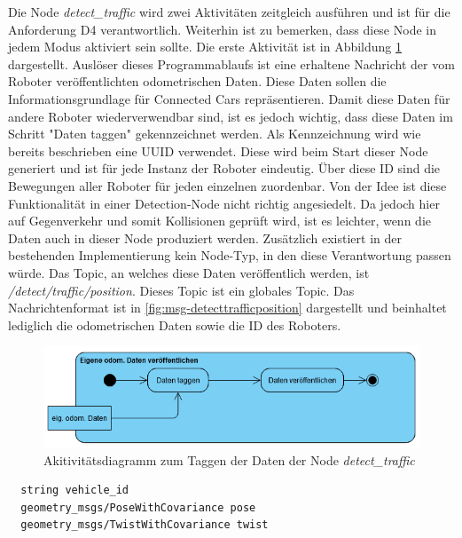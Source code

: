 Die Node \textit{detect\_traffic} wird zwei Aktivitäten zeitgleich ausführen und ist für die Anforderung D4 verantwortlich. Weiterhin ist zu bemerken, dass diese Node in jedem Modus
aktiviert sein sollte. Die erste Aktivität ist in Abbildung \ref{fig:DetectTraffic_Odom_activity} dargestellt.
Auslöser dieses Programmablaufs ist eine erhaltene Nachricht der vom Roboter veröffentlichten odometrischen Daten. Diese Daten sollen die Informationsgrundlage für Connected Cars
repräsentieren. Damit diese Daten für andere Roboter wiederverwendbar sind, ist es jedoch wichtig, dass diese Daten im Schritt "Daten taggen" gekennzeichnet werden. Als Kennzeichnung
wird wie bereits beschrieben eine UUID verwendet. Diese wird beim Start dieser Node generiert und ist für jede Instanz der Roboter eindeutig. Über diese ID sind die Bewegungen aller Roboter
für jeden einzelnen zuordenbar. Von der Idee ist diese Funktionalität in einer Detection-Node nicht richtig angesiedelt. Da jedoch hier auf Gegenverkehr und somit Kollisionen geprüft wird, ist
es leichter, wenn die Daten auch in dieser Node produziert werden. Zusätzlich existiert in der bestehenden Implementierung kein Node-Typ, in den diese Verantwortung passen würde.
Das Topic, an welches diese Daten veröffentlich werden, ist \textit{/detect/traffic/position}. Dieses Topic ist ein globales Topic. Das Nachrichtenformat ist in \ref{fig:msg-detecttrafficposition}
dargestellt und beinhaltet lediglich die odometrischen Daten sowie die ID des Roboters.

\begin{figure}[h!]
  \centering
  \includegraphics[width=\linewidth]{images/DetectTraffic_odom_activity.PNG}
  \caption{Akitivitätsdiagramm zum Taggen der Daten der Node \textit{detect\_traffic}}
  \label{fig:DetectTraffic_Odom_activity}
\end{figure}

\begin{code}
  \begin{verbatim}
  string vehicle_id
  geometry_msgs/PoseWithCovariance pose
  geometry_msgs/TwistWithCovariance twist
  \end{verbatim}
  \caption{Message-Format für das Taggen der odom. Daten}
  \label{fig:msg-detecttrafficposition}
\end{code}

